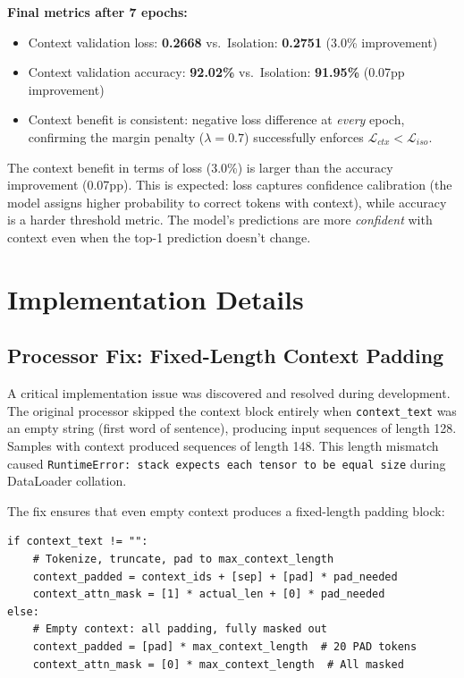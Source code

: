 \documentclass[11pt, a4paper]{article}
\begin{document}
\textbf{Final metrics after 7 epochs:}
\begin{itemize}
    \item Context validation loss: \textbf{0.2668} vs.\ Isolation: \textbf{0.2751} (3.0\% improvement)
    \item Context validation accuracy: \textbf{92.02\%} vs.\ Isolation: \textbf{91.95\%} (0.07pp improvement)
    \item Context benefit is consistent: negative loss difference at \emph{every} epoch, confirming the margin penalty ($\lambda = 0.7$) successfully enforces $\mathcal{L}_{ctx} < \mathcal{L}_{iso}$.
\end{itemize}

The context benefit in terms of loss (3.0\%) is larger than the accuracy improvement (0.07pp). This is expected: loss captures confidence calibration (the model assigns higher probability to correct tokens with context), while accuracy is a harder threshold metric. The model's predictions are more \textit{confident} with context even when the top-1 prediction doesn't change.

\section{Implementation Details}

\subsection{Processor Fix: Fixed-Length Context Padding}

A critical implementation issue was discovered and resolved during development. The original processor skipped the context block entirely when \texttt{context\_text} was an empty string (first word of sentence), producing input sequences of length 128. Samples with context produced sequences of length 148. This length mismatch caused \texttt{RuntimeError: stack expects each tensor to be equal size} during DataLoader collation.

The fix ensures that even empty context produces a fixed-length padding block:

\begin{lstlisting}[style=pythonstyle, caption={Fixed processor: empty context still gets padding block}]
if context_text != "":
    # Tokenize, truncate, pad to max_context_length
    context_padded = context_ids + [sep] + [pad] * pad_needed
    context_attn_mask = [1] * actual_len + [0] * pad_needed
else:
    # Empty context: all padding, fully masked out
    context_padded = [pad] * max_context_length  # 20 PAD tokens
    context_attn_mask = [0] * max_context_length  # All masked
\end{lstlisting}
\end{document}
